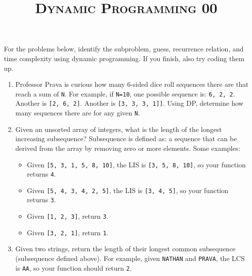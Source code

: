 \documentclass{article}
\title{\large{\textsc{Dynamic Programming 00}}}
\date{}
\begin{document}
\maketitle

\subsection*{}


For the problems below, identify the subproblem, guess, recurrence relation, and time complexity using dynamic programming. If you finish, also try coding them up.

\begin{enumerate}

\item Professor Prava is curious how many 6-sided dice roll sequences there are that reach a sum of \texttt{N}. For example, if \texttt{N=10}, one possible sequence is: \texttt{6, 2, 2}. Another is \texttt{[2, 6, 2]}. Another is \texttt{[3, 3, 3, 1]]}. Using DP, determine how many sequences there are for any given \texttt{N}.

\item Given an unsorted array of integers, what is the length of the longest increasing subsequence? Subsequence is defined as: a sequence that can be derived from the array by removing zero or more elements. Some examples:

\begin{itemize}
    \item Given \texttt{[5, 3, 1, 5, 8, 10]}, the LIS is \texttt{[3, 5, 8, 10]}, so your function returns \texttt{4}.
    \item Given \texttt{[5, 4, 3, 4, 2, 5]}, the LIS is \texttt{[3, 4, 5]}, so your function returns \texttt{3}.
    \item Given \texttt{[1, 2, 3]}, return \texttt{3}.
    \item Given \texttt{[3, 2, 1]}, return \texttt{1}.
\end{itemize}

\item Given two strings, return the length of their longest common subsequence (subsequence defined above). For example, given \texttt{NATHAN} and \texttt{PRAVA}, the LCS is \texttt{AA}, so your function should return \texttt{2}.

\end{enumerate}
\end{document}
